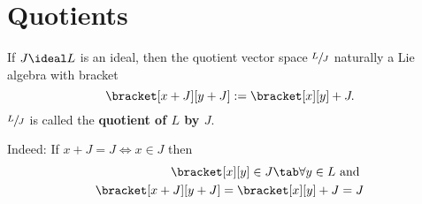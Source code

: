 \section{Quotients}
\begin{definition}
    If $J \ideal L$ is an ideal, then the quotient vector space $\sfrac{L}{J}$ 
    naturally a Lie algebra with bracket
    $$ \bracket[x + J][y + J] := \bracket[x][y] + J.$$
    $\sfrac{L}{J}$ is called the \textbf{quotient of $L$ by $J$}.
    
    Indeed: If $x + J = J \iff x \in J$ then
    \begin{align*}
        \bracket[x][y] \in J \tab \forall y \in L \text{ and }\\
        \bracket[x + J][y +J] = \bracket[x][y] + J = J
    \end{align*}
\end{definition}